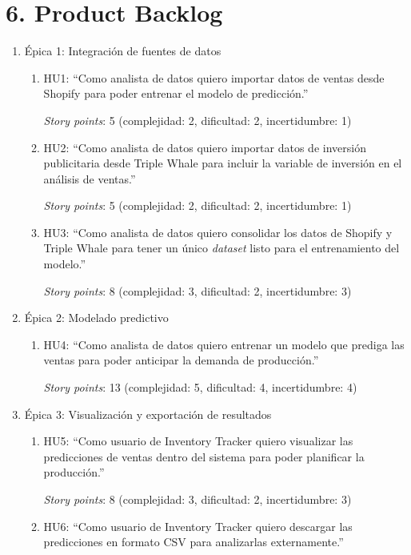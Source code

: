\documentclass[
11pt, %
]{charter}
\begin{document}
\section{6. Product Backlog}
\label{sec:backlog}


\begin{enumerate}
	\item Épica 1: Integración de fuentes de datos
	\begin{enumerate}
		\item HU1: “Como analista de datos quiero importar datos de ventas desde Shopify para poder entrenar el modelo de predicción.”

		\textit{Story points}: 5 (complejidad: 2, dificultad: 2, incertidumbre: 1)

		\item HU2: “Como analista de datos quiero importar datos de inversión publicitaria desde Triple Whale para incluir la variable de inversión en el análisis de ventas.”

		\textit{Story points}: 5 (complejidad: 2, dificultad: 2, incertidumbre: 1)

		\item HU3: “Como analista de datos quiero consolidar los datos de Shopify y Triple Whale para tener un único \textit{dataset} listo para el entrenamiento del modelo.”

		\textit{Story points}: 8 (complejidad: 3, dificultad: 2, incertidumbre: 3)
	\end{enumerate}
	\item Épica 2: Modelado predictivo
	\begin{enumerate}
		\item HU4: “Como analista de datos quiero entrenar un modelo que prediga las ventas para poder anticipar la demanda de producción.”

		\textit{Story points}: 13 (complejidad: 5, dificultad: 4, incertidumbre: 4)
	\end{enumerate}
	\item Épica 3: Visualización y exportación de resultados
	\begin{enumerate}
		\item HU5: “Como usuario de Inventory Tracker quiero visualizar las predicciones de ventas dentro del sistema para poder planificar la producción.”

		\textit{Story points}: 8 (complejidad: 3, dificultad: 2, incertidumbre: 3)

		\item HU6: “Como usuario de Inventory Tracker quiero descargar las predicciones en formato CSV para analizarlas externamente.”


\end{enumerate}
\end{enumerate}
\end{document}
